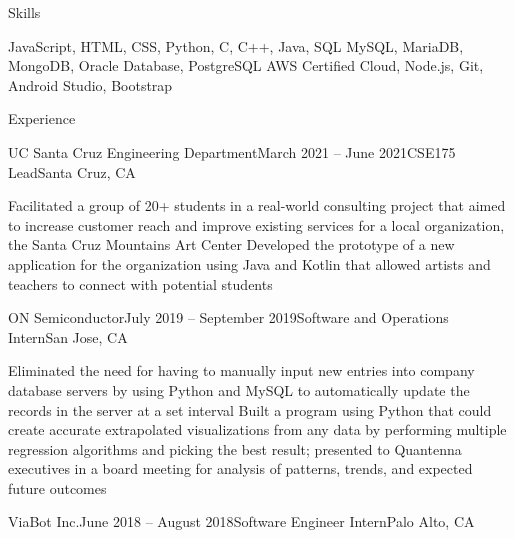 \documentclass[11pt]{cv_template}
\begin{document}
\begin{cv}
\begin{cvsection}{Skills}

\descitem[Languages] JavaScript, HTML, CSS, Python, C, C++, Java, SQL
\descitem[Databases] MySQL, MariaDB, MongoDB, Oracle Database, PostgreSQL
\descitem[Utilities] AWS Certified Cloud, Node.js, Git, Android Studio, Bootstrap

\end{cvsection}


\begin{cvsection}{Experience}


\begin{cvsubsection}
{UC Santa Cruz Engineering Department}{March 2021 -- June 2021}{CSE175 Lead}{Santa Cruz, CA}

\listitem Facilitated a group of 20+ students in a real-world consulting project that aimed to increase customer reach and improve existing services for a local organization, the Santa Cruz Mountains Art Center
\listitem Developed the prototype of a new application for the organization using Java and Kotlin that allowed artists and teachers to connect with potential students

\end{cvsubsection}


\begin{cvsubsection}
{ON Semiconductor}{July 2019 -- September 2019}{Software and Operations Intern}{San Jose, CA}

\listitem Eliminated the need for having to manually input new entries into company database servers by using Python and MySQL to automatically update the records in the server at a set interval
\listitem Built a program using Python that could create accurate extrapolated visualizations from any data by performing multiple regression algorithms and picking the best result; presented to Quantenna executives in a board meeting for analysis of patterns, trends, and expected future outcomes

\end{cvsubsection}


\begin{cvsubsection}
{ViaBot Inc.}{June 2018 -- August 2018}{Software Engineer Intern}{Palo Alto, CA}


\end{cvsubsection}
\end{cvsection}
\end{cv}
\end{document}
